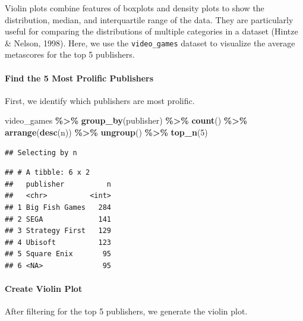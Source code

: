 \documentclass[
  b5paper]{book}
\newenvironment{Shaded}{\begin{snugshade}}{\end{snugshade}}
\newcommand{\DecValTok}[1]{\textcolor[rgb]{0.00,0.00,0.81}{#1}}
\newcommand{\FunctionTok}[1]{\textcolor[rgb]{0.13,0.29,0.53}{\textbf{#1}}}
\newcommand{\NormalTok}[1]{#1}
\newcommand{\SpecialCharTok}[1]{\textcolor[rgb]{0.81,0.36,0.00}{\textbf{#1}}}
\begin{document}
Violin plots combine features of boxplots and density plots to show the distribution, median, and interquartile range of the data. They are particularly useful for comparing the distributions of multiple categories in a dataset (Hintze \& Nelson, 1998). Here, we use the \texttt{video\_games} dataset to visualize the average metascores for the top 5 publishers.

\hypertarget{find-the-5-most-prolific-publishers}{%
\paragraph*{Find the 5 Most Prolific Publishers}\label{find-the-5-most-prolific-publishers}}

First, we identify which publishers are most prolific.

\begin{Shaded}
\begin{Highlighting}[]
\NormalTok{video\_games }\SpecialCharTok{\%\textgreater{}\%}
  \FunctionTok{group\_by}\NormalTok{(publisher) }\SpecialCharTok{\%\textgreater{}\%}
  \FunctionTok{count}\NormalTok{() }\SpecialCharTok{\%\textgreater{}\%}
  \FunctionTok{arrange}\NormalTok{(}\FunctionTok{desc}\NormalTok{(n)) }\SpecialCharTok{\%\textgreater{}\%}
  \FunctionTok{ungroup}\NormalTok{() }\SpecialCharTok{\%\textgreater{}\%}
  \FunctionTok{top\_n}\NormalTok{(}\DecValTok{5}\NormalTok{)}
\end{Highlighting}
\end{Shaded}

\begin{verbatim}
## Selecting by n
\end{verbatim}

\begin{verbatim}
## # A tibble: 6 x 2
##   publisher          n
##   <chr>          <int>
## 1 Big Fish Games   284
## 2 SEGA             141
## 3 Strategy First   129
## 4 Ubisoft          123
## 5 Square Enix       95
## 6 <NA>              95
\end{verbatim}

\hypertarget{create-violin-plot}{%
\paragraph*{Create Violin Plot}\label{create-violin-plot}}

After filtering for the top 5 publishers, we generate the violin plot.
\end{document}
